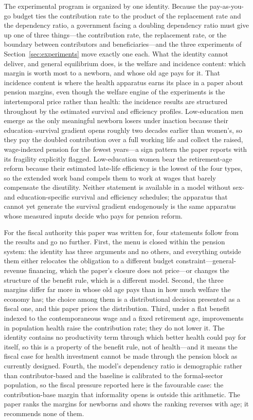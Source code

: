 \documentclass[12pt,a4paper]{article}
\begin{document}
The experimental program is organized by one identity. Because the pay-as-you-go budget ties the contribution rate to the product of the replacement rate and the dependency ratio, a government facing a doubling dependency ratio must give up one of three things---the contribution rate, the replacement rate, or the boundary between contributors and beneficiaries---and the three experiments of Section~\ref{sec:experiments} move exactly one each. What the identity cannot deliver, and general equilibrium does, is the welfare and incidence content: which margin is worth most to a newborn, and whose old age pays for it. That incidence content is where the health apparatus earns its place in a paper about pension margins, even though the welfare engine of the experiments is the intertemporal price rather than health: the incidence results are structured throughout by the estimated survival and efficiency profiles. Low-education men emerge as the only meaningful newborn losers under inaction because their education--survival gradient opens roughly two decades earlier than women's, so they pay the doubled contribution over a full working life and collect the raised, wage-indexed pension for the fewest years---a sign pattern the paper reports with its fragility explicitly flagged. Low-education women bear the retirement-age reform because their estimated late-life efficiency is the lowest of the four types, so the extended work band compels them to work at wages that barely compensate the disutility. Neither statement is available in a model without sex- and education-specific survival and efficiency schedules; the apparatus that cannot yet generate the survival gradient endogenously is the same apparatus whose measured inputs decide who pays for pension reform.

For the fiscal authority this paper was written for, four statements follow from the results and go no further. First, the menu is closed within the pension system: the identity has three arguments and no others, and everything outside them either relocates the obligation to a different budget constraint---general-revenue financing, which the paper's closure does not price---or changes the structure of the benefit rule, which is a different model. Second, the three margins differ far more in whose old age pays than in how much welfare the economy has; the choice among them is a distributional decision presented as a fiscal one, and this paper prices the distribution. Third, under a flat benefit indexed to the contemporaneous wage and a fixed retirement age, improvements in population health raise the contribution rate; they do not lower it. The identity contains no productivity term through which better health could pay for itself, so this is a property of the benefit rule, not of health---and it means the fiscal case for health investment cannot be made through the pension block as currently designed. Fourth, the model's dependency ratio is demographic rather than contributor-based and the baseline is calibrated to the formal-sector population, so the fiscal pressure reported here is the favourable case: the contribution-base margin that informality opens is outside this arithmetic. The paper ranks the margins for newborns and shows the ranking reverses with age; it recommends none of them.
\end{document}

